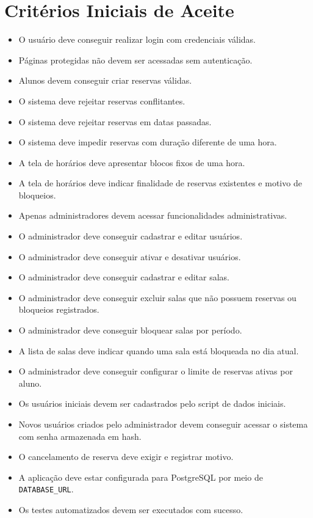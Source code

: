 \documentclass[12pt,a4paper]{article}
\begin{document}
\section{Critérios Iniciais de Aceite}

\begin{itemize}
    \item O usuário deve conseguir realizar login com credenciais válidas.
    \item Páginas protegidas não devem ser acessadas sem autenticação.
    \item Alunos devem conseguir criar reservas válidas.
    \item O sistema deve rejeitar reservas conflitantes.
    \item O sistema deve rejeitar reservas em datas passadas.
    \item O sistema deve impedir reservas com duração diferente de uma hora.
    \item A tela de horários deve apresentar blocos fixos de uma hora.
    \item A tela de horários deve indicar finalidade de reservas existentes e motivo de bloqueios.
    \item Apenas administradores devem acessar funcionalidades administrativas.
    \item O administrador deve conseguir cadastrar e editar usuários.
    \item O administrador deve conseguir ativar e desativar usuários.
    \item O administrador deve conseguir cadastrar e editar salas.
    \item O administrador deve conseguir excluir salas que não possuem reservas ou bloqueios registrados.
    \item O administrador deve conseguir bloquear salas por período.
    \item A lista de salas deve indicar quando uma sala está bloqueada no dia atual.
    \item O administrador deve conseguir configurar o limite de reservas ativas por aluno.
    \item Os usuários iniciais devem ser cadastrados pelo script de dados iniciais.
    \item Novos usuários criados pelo administrador devem conseguir acessar o sistema com senha armazenada em hash.
    \item O cancelamento de reserva deve exigir e registrar motivo.
    \item A aplicação deve estar configurada para PostgreSQL por meio de \texttt{DATABASE\_URL}.
    \item Os testes automatizados devem ser executados com sucesso.
\end{itemize}
\end{document}
